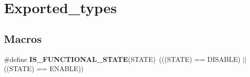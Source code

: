 \hypertarget{group___exported__types}{}\section{Exported\+\_\+types}
\label{group___exported__types}
\subsection*{Macros}
\begin{DoxyCompactItemize}
\item 
\#define {\bfseries I\+S\+\_\+\+F\+U\+N\+C\+T\+I\+O\+N\+A\+L\+\_\+\+S\+T\+A\+TE}(S\+T\+A\+TE)~(((S\+T\+A\+TE) == D\+I\+S\+A\+B\+LE) $\vert$$\vert$ ((S\+T\+A\+TE) == E\+N\+A\+B\+LE))\hypertarget{group___exported__types_gaffaf7c3f537d7a3370b1bbdda67a2bf6}{}\label{group___exported__types_gaffaf7c3f537d7a3370b1bbdda67a2bf6}

\end{DoxyCompactItemize}
